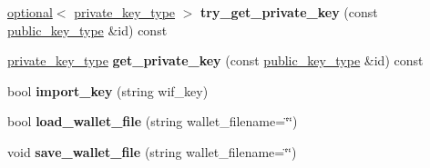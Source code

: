 \begin{DoxyCompactItemize}
\mbox{\label{classaacio_1_1wallet_1_1detail_1_1wallet__api__impl_a555d1b03174f0ccae7cbe785100e3468}} 
\mbox{\hyperlink{classaacio_1_1optional}{optional}}$<$ \mbox{\hyperlink{classfc_1_1crypto_1_1private__key}{private\+\_\+key\+\_\+type}} $>$ {\bfseries try\+\_\+get\+\_\+private\+\_\+key} (const \mbox{\hyperlink{classfc_1_1crypto_1_1public__key}{public\+\_\+key\+\_\+type}} \&id) const
\item 
\mbox{\label{classaacio_1_1wallet_1_1detail_1_1wallet__api__impl_a06d8b5960ded0702daab625c441c20a4}} 
\mbox{\hyperlink{classfc_1_1crypto_1_1private__key}{private\+\_\+key\+\_\+type}} {\bfseries get\+\_\+private\+\_\+key} (const \mbox{\hyperlink{classfc_1_1crypto_1_1public__key}{public\+\_\+key\+\_\+type}} \&id) const
\item 
\mbox{\label{classaacio_1_1wallet_1_1detail_1_1wallet__api__impl_a88bd7f66f332a688a639a46baec0c2b3}} 
bool {\bfseries import\+\_\+key} (string wif\+\_\+key)
\item 
\mbox{\label{classaacio_1_1wallet_1_1detail_1_1wallet__api__impl_a4a0a79ed8ca6928039c5b2861e925ea8}} 
bool {\bfseries load\+\_\+wallet\+\_\+file} (string wallet\+\_\+filename=\char`\"{}\char`\"{})
\item 
\mbox{\label{classaacio_1_1wallet_1_1detail_1_1wallet__api__impl_af16d5828a3ad70b4d4e58e0870b2bc54}} 
void {\bfseries save\+\_\+wallet\+\_\+file} (string wallet\+\_\+filename=\char`\"{}\char`\"{})
\end{DoxyCompactItemize}
